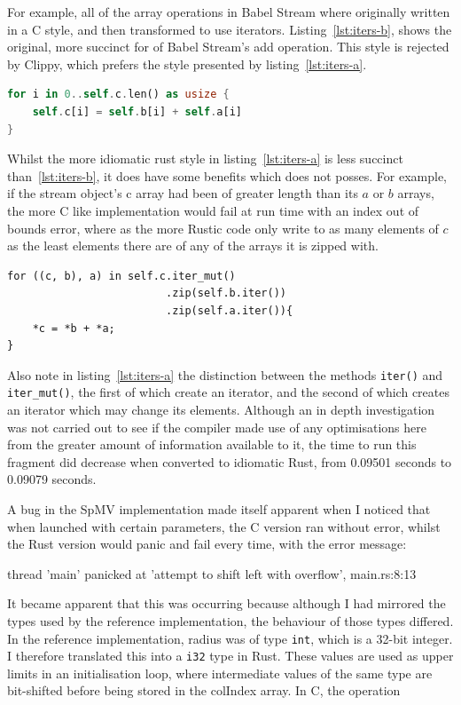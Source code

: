 For example, all of the array operations in Babel Stream where originally written in a C style, and then transformed to use iterators. Listing~\ref{lst:iters-b}, shows the original, more succinct for of Babel Stream's add operation. This style is rejected by Clippy, which prefers the style presented by listing~\ref{lst:iters-a}.
\begin{lstlisting}[language=Rust, label=lst:iters-b, caption={Babel Stream Add, before applying idiomatic Rust style}]
for i in 0..self.c.len() as usize {
    self.c[i] = self.b[i] + self.a[i]
}
\end{lstlisting}
Whilst the more idiomatic rust style in listing~\ref{lst:iters-a} is less succinct than~\ref{lst:iters-b}, it does have some benefits which does not posses. For example, if the stream object's c array had been of greater length than its $a$ or $b$ arrays, the more C like implementation would fail at run time with an index out of bounds error, where as the more Rustic code only write to as many elements of $c$ as the least elements there are of any of the arrays it is zipped with.
\begin{verbatim}
for ((c, b), a) in self.c.iter_mut()
                         .zip(self.b.iter())
                         .zip(self.a.iter()){
    *c = *b + *a;
}
\end{verbatim}
Also note in listing~\ref{lst:iters-a} the distinction between the methods \texttt{iter()} and \texttt{iter\_mut()}, the first of which create an iterator, and the second of which creates an iterator which may change its elements. Although an in depth investigation was not carried out to see if the compiler made use of any optimisations here from the greater amount of information available to it, the time to run this fragment did decrease when converted to idiomatic Rust, from 0.09501 seconds to 0.09079 seconds.

A bug in the SpMV implementation made itself apparent when I noticed that when launched with certain parameters, the C version ran without error, whilst the Rust version would panic and fail every time, with the error message:

thread 'main' panicked at 'attempt to shift left with overflow', main.rs:8:13

It became apparent that this was occurring because although I had mirrored the types used by the reference implementation, the behaviour of those types differed. In the reference implementation, radius was of type \texttt{int}, which is a 32-bit integer. I therefore translated this into a \texttt{i32} type in Rust. These values are used as upper limits in an initialisation loop, where intermediate values of the same type are bit-shifted before being stored in the colIndex array. In C, the operation

